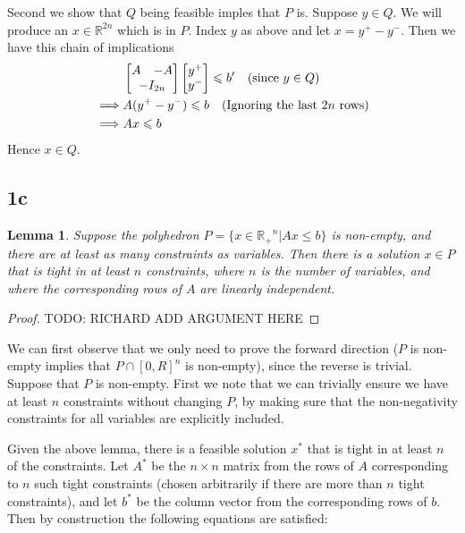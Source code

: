 \documentclass{article}
\newtheorem{lemma}{Lemma}
\begin{document}
Second we show that $Q$ being feasible imples that $P$ is. Suppose $y\in Q$. We will produce an $x \in \mathbb{R}^{2n}$ which is in $P$. Index $y$ as above and let $x = y^+ - y^-$. Then we have this chain of implications
\begin{align*}
&\begin{bmatrix} A & -A \\ \multicolumn{2}{c}{-I_{2n}} \end{bmatrix} \begin{bmatrix} y^+ \\ y^- \end{bmatrix} \leqslant b' \quad \text{(since $y \in Q$)}\\
\implies & A(y^+ - y^-) \leqslant b \quad \text{(Ignoring the last $2n$ rows)}\\
\implies & Ax \leqslant b
\end{align*}
Hence $x \in Q$.

\subsection*{1c}

\begin{lemma}
  Suppose the polyhedron $P = \{x \in \mathbb{R_+}^n | Ax \leq b\}$ is non-empty,
  and there are at least as many constraints as variables. Then
  there is a solution $x \in P$ that is tight in at least $n$
  constraints, where $n$ is the number of variables, and where the
  corresponding rows of $A$ are linearly independent.
\end{lemma}
\begin{proof}
  TODO: RICHARD ADD ARGUMENT HERE
\end{proof}

We can first observe that we only need to prove the forward direction
($P$ is non-empty implies that $P \cap [0, R]^n$ is non-empty),
since the reverse is trivial. Suppose that $P$ is non-empty. First
we note that we can trivially ensure we have at least $n$ constraints
without changing $P$, by making sure that the non-negativity constraints
for all variables are explicitly included.

Given the above lemma,
there is a feasible solution $x^*$ that is tight in at least $n$
of the constraints. Let $A^*$ be the $n \times n$ matrix from the rows
of $A$ corresponding to $n$ such tight constraints (chosen
arbitrarily if there are more than $n$ tight constraints), and let
$b^*$ be the column vector from the corresponding rows of $b$.
Then by construction the following equations are satisfied:
\end{document}
